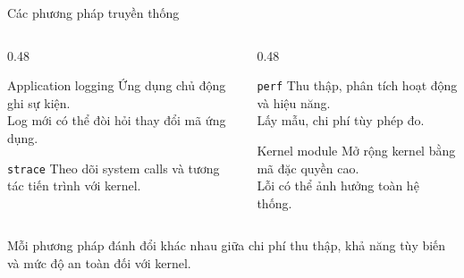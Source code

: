 \begin{frame}{Các phương pháp truyền thống}
  \begin{columns}[T,onlytextwidth]
    \begin{column}{0.48\textwidth}
      \begin{block}{Application logging}
        Ứng dụng chủ động ghi sự kiện.\\
        Log mới có thể đòi hỏi thay đổi mã ứng dụng.
      \end{block}
      \begin{block}{\texttt{strace}}
        Theo dõi system calls và tương tác tiến trình với kernel.
      \end{block}
    \end{column}
    \begin{column}{0.48\textwidth}
      \begin{block}{\texttt{perf}}
        Thu thập, phân tích hoạt động và hiệu năng.\\
        Lấy mẫu, chi phí tùy phép đo.
      \end{block}
      \begin{block}{Kernel module}
        Mở rộng kernel bằng mã đặc quyền cao.\\
        Lỗi có thể ảnh hưởng toàn hệ thống.
      \end{block}
    \end{column}
  \end{columns}
  \vspace{0.20cm}
  Mỗi phương pháp đánh đổi khác nhau giữa chi phí thu thập, khả năng tùy biến và mức độ an toàn đối với kernel.
\end{frame}

